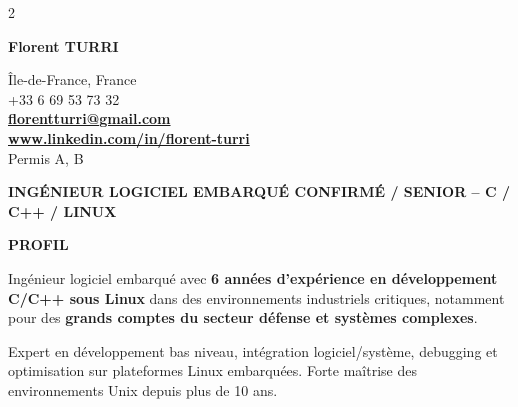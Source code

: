 \documentclass[11pt]{article}
\begin{document}

\begin{paracol}{2}
\switchcolumn[0]


{\textbf{Florent TURRI}}

\vspace{2mm}

\switchcolumn

\begin{flushright}
Île-de-France, France \\
+33 6 69 53 73 32 \\
\textbf{\href{mailto:florentturri@gmail.com}{florentturri@gmail.com} \\}
\textbf{\href{https://www.linkedin.com/in/florent-turri}{www.linkedin.com/in/florent-turri} \\}
Permis A, B
\end{flushright}

\end{paracol}

\begin{center}
{\textbf{INGÉNIEUR LOGICIEL EMBARQUÉ CONFIRMÉ / SENIOR – C / C++ / LINUX}}


\textbf{PROFIL}

Ingénieur logiciel embarqué avec \textbf{6 années d’expérience en développement C/C++ sous Linux} dans des environnements industriels critiques, notamment pour des \textbf{grands comptes du secteur défense et systèmes complexes}.

Expert en développement bas niveau, intégration logiciel/système, debugging et optimisation sur plateformes Linux embarquées. Forte maîtrise des environnements Unix depuis plus de 10 ans.
\end{center}
\vspace{5mm}

\end{document}
